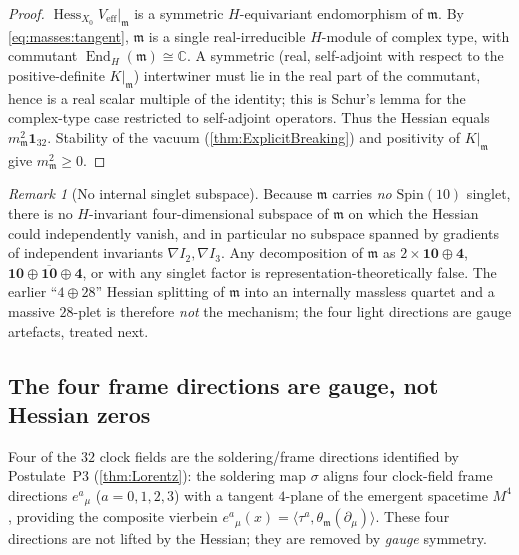 \documentclass[11pt]{article}
\theoremstyle{plain}
\theoremstyle{definition}
\theoremstyle{remark}
\newtheorem{remark}[theorem]{Remark}
\begin{document}
\begin{proof}
$\operatorname{Hess}_{X_{0}}V_{\mathrm{eff}}|_{\mathfrak m}$ is a symmetric
$H$-equivariant endomorphism of $\mathfrak m$. By \eqref{eq:masses:tangent},
$\mathfrak m$ is a single real-irreducible $H$-module of complex type, with
commutant $\operatorname{End}_{H}(\mathfrak m)\cong\mathbb C$. A symmetric (real,
self-adjoint with respect to the positive-definite $K|_{\mathfrak m}$)
intertwiner must lie in the real part of the commutant, hence is a real scalar
multiple of the identity; this is Schur's lemma for the complex-type case
restricted to self-adjoint operators. Thus the Hessian equals
$m_{\mathfrak m}^{2}\mathbf 1_{32}$. Stability of the vacuum
(\autoref{thm:ExplicitBreaking}) and positivity of $K|_{\mathfrak m}$ give
$m_{\mathfrak m}^{2}\ge 0$.
\end{proof}

\begin{remark}[No internal singlet subspace]\label{rmk:masses:nosinglet}
Because $\mathfrak m$ carries \emph{no} $\mathrm{Spin}(10)$ singlet, there is no
$H$-invariant four-dimensional subspace of $\mathfrak m$ on which the Hessian
could independently vanish, and in particular no subspace spanned by gradients
of independent invariants $\nabla I_{2},\nabla I_{3}$. Any decomposition of
$\mathfrak m$ as $2\times\mathbf{10}\oplus\mathbf 4$, $\mathbf{10}\oplus
\overline{\mathbf{10}}\oplus\mathbf 4$, or with any singlet factor is
representation-theoretically false. The earlier ``$4\oplus 28$'' Hessian
splitting of $\mathfrak m$ into an internally massless quartet and a massive
$28$-plet is therefore \emph{not} the mechanism; the four light directions are
gauge artefacts, treated next.
\end{remark}

\subsection{The four frame directions are gauge, not Hessian zeros}
\label{sec:masses:frame}

Four of the $32$ clock fields are the soldering/frame directions identified by
Postulate~P3 (\autoref{thm:Lorentz}): the soldering map $\sigma$ aligns four
clock-field frame directions $e^{a}{}_{\mu}$ ($a=0,1,2,3$) with a tangent
$4$-plane of the emergent spacetime $M^{4}$, providing the composite vierbein
$e^{a}{}_{\mu}(x)=\langle\tau^{a},\theta_{\mathfrak m}(\partial_{\mu})\rangle$.
These four directions are not lifted by the Hessian; they are removed by
\emph{gauge} symmetry.
\end{document}
